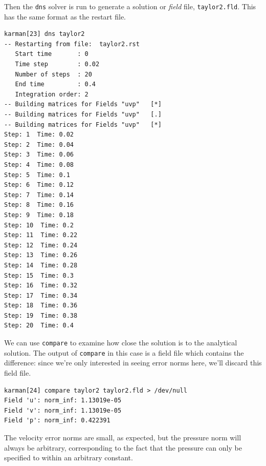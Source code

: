\documentclass[11pt,a4paper]{report}
\begin{document}
Then the \texttt{dns} solver is run to generate a solution or
\textsl{field} file, \texttt{taylor2.fld}.  This has the same format
as the restart file.
{\small
\begin{verbatim}
karman[23] dns taylor2
-- Restarting from file:  taylor2.rst
   Start time       : 0
   Time step        : 0.02
   Number of steps  : 20
   End time         : 0.4
   Integration order: 2
-- Building matrices for Fields "uvp"   [*]
-- Building matrices for Fields "uvp"   [.]
-- Building matrices for Fields "uvp"   [*]
Step: 1  Time: 0.02
Step: 2  Time: 0.04
Step: 3  Time: 0.06
Step: 4  Time: 0.08
Step: 5  Time: 0.1
Step: 6  Time: 0.12
Step: 7  Time: 0.14
Step: 8  Time: 0.16
Step: 9  Time: 0.18
Step: 10  Time: 0.2
Step: 11  Time: 0.22
Step: 12  Time: 0.24
Step: 13  Time: 0.26
Step: 14  Time: 0.28
Step: 15  Time: 0.3
Step: 16  Time: 0.32
Step: 17  Time: 0.34
Step: 18  Time: 0.36
Step: 19  Time: 0.38
Step: 20  Time: 0.4
\end{verbatim}
}

We can use \texttt{compare} to examine how close the solution is to the
analytical solution.  The output of \texttt{compare} in this case
is a field file which contains the difference: since we're only interested
in seeing error norms here, we'll discard this field file.
{\small
\begin{verbatim}
karman[24] compare taylor2 taylor2.fld > /dev/null
Field 'u': norm_inf: 1.13019e-05
Field 'v': norm_inf: 1.13019e-05
Field 'p': norm_inf: 0.422391
\end{verbatim}
}
\noindent
The velocity error norms are small, as expected, but the pressure norm
will always be arbitrary, corresponding to the fact that the pressure
can only be specified to within an arbitrary constant.
\end{document}

